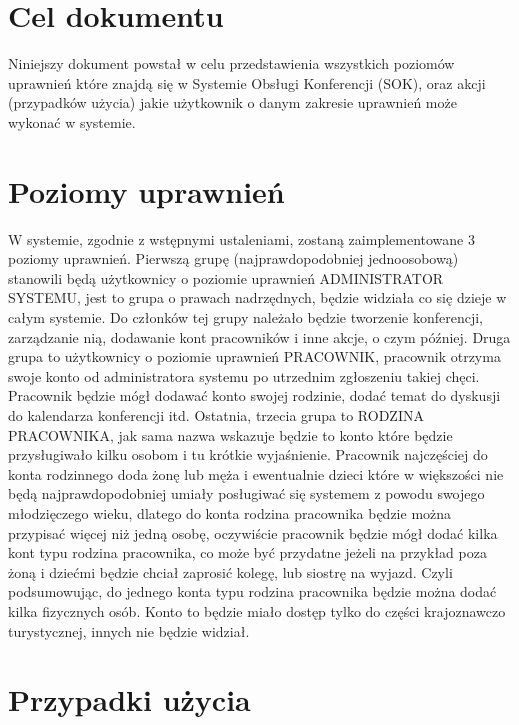 ﻿\section{Cel dokumentu}
\suppressfloats[t]  %

Niniejszy dokument powstał w celu przedstawienia wszystkich poziomów uprawnień które znajdą się w Systemie Obsługi Konferencji (SOK), oraz akcji (przypadków użycia) jakie użytkownik o danym zakresie uprawnień może wykonać w systemie. 

\section{Poziomy uprawnień}

W systemie, zgodnie z wstępnymi ustaleniami, zostaną zaimplementowane 3 poziomy uprawnień. \newline
Pierwszą grupę (najprawdopodobniej jednoosobową) stanowili będą użytkownicy o poziomie uprawnień ADMINISTRATOR SYSTEMU, jest to grupa o prawach nadrzędnych, będzie widziała co się dzieje w całym systemie. Do członków tej grupy należało będzie tworzenie konferencji, zarządzanie nią, dodawanie kont pracowników i inne akcje, o czym później. \newline
Druga grupa to użytkownicy o poziomie uprawnień PRACOWNIK, pracownik otrzyma swoje konto od administratora systemu po utrzednim zgłoszeniu takiej chęci. Pracownik będzie mógł dodawać konto swojej rodzinie, dodać temat do dyskusji do kalendarza konferencji itd. \newline
Ostatnia, trzecia grupa to RODZINA PRACOWNIKA, jak sama nazwa wskazuje będzie to konto które będzie przysługiwało kilku osobom i tu krótkie wyjaśnienie. Pracownik najczęściej do konta rodzinnego doda żonę lub męża i ewentualnie dzieci które w większości nie będą najprawdopodobniej umiały posługiwać się systemem z powodu swojego młodzięczego wieku, dlatego do konta rodzina pracownika będzie można przypisać więcej niż jedną osobę, oczywiście pracownik będzie mógł dodać kilka kont typu rodzina pracownika, co może być przydatne jeżeli na przykład poza żoną i dziećmi będzie chciał zaprosić kolegę, lub siostrę na wyjazd. Czyli podsumowując, do jednego konta typu rodzina pracownika będzie można dodać kilka fizycznych osób. Konto to będzie miało dostęp tylko do części krajoznawczo turystycznej, innych nie będzie widział.

\section{Przypadki użycia}

